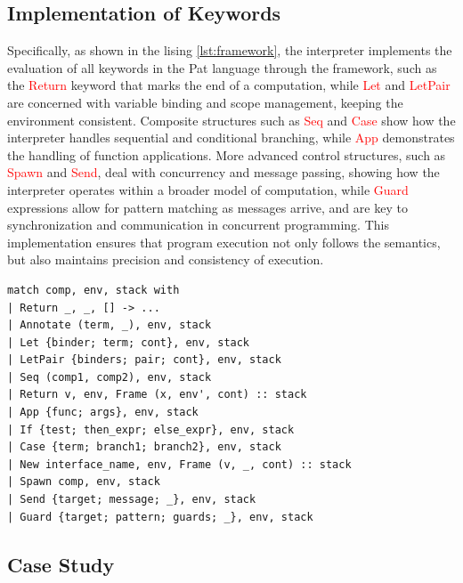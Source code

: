 \documentclass{l4proj}
\begin{document}
\subsection{Implementation of Keywords}
Specifically, as shown in the lising \ref{lst:framework}, the interpreter implements the evaluation of all keywords in the Pat language through the framework, such as the \textcolor{red}{Return} keyword that marks the end of a computation, while \textcolor{red}{Let} and \textcolor{red}{LetPair} are concerned with variable binding and scope management, keeping the environment consistent. Composite structures such as \textcolor{red}{Seq} and \textcolor{red}{Case} show how the interpreter handles sequential and conditional branching, while \textcolor{red}{App} demonstrates the handling of function applications. More advanced control structures, such as \textcolor{red}{Spawn} and \textcolor{red}{Send}, deal with concurrency and message passing, showing how the interpreter operates within a broader model of computation, while \textcolor{red}{Guard} expressions allow for pattern matching as messages arrive, and are key to synchronization and communication in concurrent programming. This implementation ensures that program execution not only follows the semantics, but also maintains precision and consistency of execution.

\noindent\begin{minipage}{\linewidth}
\lstset{style=Ocamlstyle}
\begin{lstlisting}[caption={Source code for the specific implementation of evaluation for all keywords in Pat using the CEK architecture}, label={lst:framework}]
match comp, env, stack with
| Return _, _, [] -> ...
| Annotate (term, _), env, stack 
| Let {binder; term; cont}, env, stack 
| LetPair {binders; pair; cont}, env, stack 
| Seq (comp1, comp2), env, stack 
| Return v, env, Frame (x, env', cont) :: stack
| App {func; args}, env, stack
| If {test; then_expr; else_expr}, env, stack
| Case {term; branch1; branch2}, env, stack 
| New interface_name, env, Frame (v, _, cont) :: stack
| Spawn comp, env, stack
| Send {target; message; _}, env, stack
| Guard {target; pattern; guards; _}, env, stack
\end{lstlisting}
\end{minipage}

\subsection{Case Study}
\end{document}

